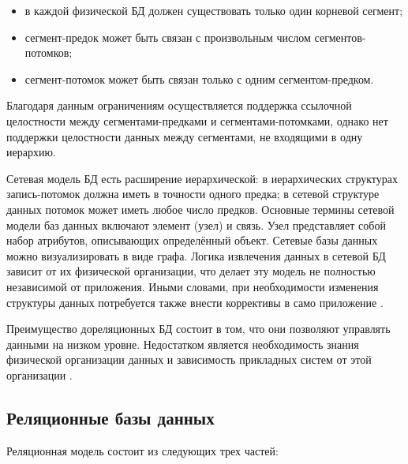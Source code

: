\begin{itemize}[label*=--]
	\item в каждой физической БД должен существовать только один корневой сегмент;
	\item сегмент-предок может быть связан с произвольным числом сегментов-потомков;
	\item сегмент-потомок может быть связан только с одним сегментом-предком.
\end{itemize}

Благодаря данным ограничениям осуществляется поддержка ссылочной целостности между сегментами-предками и сегментами-потомками, однако нет поддержки целостности данных между сегментами, не входящими в одну иерархию.

Сетевая модель БД есть расширение иерархической: в иерархических структурах запись-потомок должна иметь в точности одного предка; в сетевой структуре данных потомок может иметь любое число предков\cite{info_db_kuznecov}. Основные термины сетевой модели баз данных включают элемент (узел) и связь. Узел представляет собой набор атрибутов, описывающих определённый объект. Сетевые базы данных можно визуализировать в виде графа. Логика извлечения данных в сетевой БД зависит от их физической организации, что делает эту модель не полностью независимой от приложения. Иными словами, при необходимости изменения структуры данных потребуется также внести коррективы в само приложение \cite{info_lections_db}. 

Преимущество дореляционных БД состоит в том, что они позволяют управлять данными на низком уровне. Недостатком является необходимость знания физической организации данных и зависимость прикладных систем от этой организации \cite{info_db_kuznecov}.

\clearpage 

\subsection{Реляционные базы данных}

Реляционная модель состоит из следующих трех частей: 

